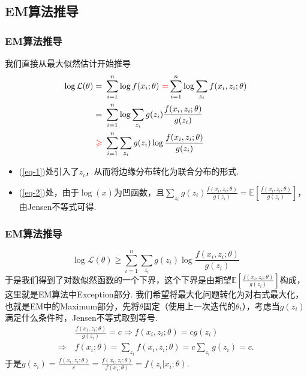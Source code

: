 \documentclass[UTF8]{ctexbeamer}
\let\geq=\geqslant %
\numberwithin{equation}{section}  %
\def\E{\mathbb{E}}          %
\def\L{\mathcal{L}}         %
\def\red{\color{red}}       %
\begin{document}
\subsection{EM算法推导}
\begin{frame}
    \frametitle{EM算法推导}
    我们直接从最大似然估计开始推导
    \begin{align}
        \label{eq-1}\log \L(\theta) =&\ \sum_{i=1}^n\log f(x_i;\theta)\ {\red=} \sum_{i=1}^n\log\sum_{z_i}f(x_i,z_i;\theta)\\
        \nonumber =&\ \sum_{i=1}^n\log\sum_{z_i}g(z_i)\frac{f(x_i,z_i;\theta)}{g(z_i)}\\
        \label{eq-2}{\red\geq}&\ \sum_{i=1}^n\sum_{z_i}g(z_i)\log\frac{f(x_i,z_i;\theta)}{g(z_i)}
    \end{align}
    \pause
    \begin{itemize}[<+->]
        \item (\ref{eq-1})处引入了$z_i$，从而将边缘分布转化为联合分布的形式.
        \item (\ref{eq-2})处，由于$\log(x)$为凹函数，且$\sum_{z_i}g(z_i)\frac{f(x_i,z_i;\theta)}{g(z_i)}=\E\left[\frac{f(x_i,z_i;\theta)}{g(z_i)}\right]$，由Jensen不等式可得.
    \end{itemize}
\end{frame}

\begin{frame}
    \frametitle{EM算法推导}

    \begin{equation*}
        \log \L(\theta) \geq \sum_{i=1}^n\sum_{z_i}g(z_i)\log\frac{f(x_i,z_i;\theta)}{g(z_i)}
    \end{equation*}
    于是我们得到了对数似然函数的一个下界，这个下界是由期望$\E\left[\frac{f(x_i,z_i;\theta)}{g(z_i)}\right]$构成，这里就是EM算法中Exception部分. 我们希望将最大化问题转化为对右式最大化，也就是EM中的Maximum部分，先将$\theta$固定（使用上一次迭代的$\theta_{t}$），考虑当$g(z_i)$满足什么条件时，Jensen不等式取到等号.\pause
    \begin{align*}
        &\ \frac{f(x_i,z_i;\theta)}{g(z_i)} = c\Rightarrow f(x_i,z_i;\theta) = cg(z_i)\\
        \Rightarrow&\ f(x_i;\theta) =\sum_{z_i}f(x_i,z_i;\theta) = c\sum_{z_i}g(z_i) = c.
    \end{align*}
    于是$g(z_i) = \frac{f(x_i,z_i;\theta)}{c} = \frac{f(x_i,z_i;\theta)}{f(x_i;\theta)}=f(z_i|x_i;\theta)$.

\end{frame}
\end{document}
